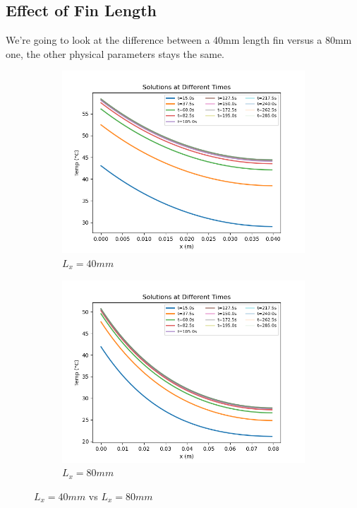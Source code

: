 \documentclass{article}
\begin{document}
\subsection{Effect of Fin Length}
We're going to look at the difference between a 40mm length fin versus a 80mm one, the other physical parameters stays the same. \\

\begin{figure}[H]
\begin{subfigure}{.5\textwidth}
  \centering
  \includegraphics[width=1.1\linewidth]{images/graph40mm_standard.png}
  \caption{$L_x=40mm$}
  \label{fig:sfig1}
\end{subfigure}
\begin{subfigure}{.5\textwidth}
  \centering
  \includegraphics[width=1.1\linewidth]{images/graph80mm.png}
  \caption{$L_x=80mm$}
\end{subfigure}
\caption{$L_x=40mm$ vs $L_x=80mm$  }
\label{fig:fig}
\end{figure}
\end{document}
